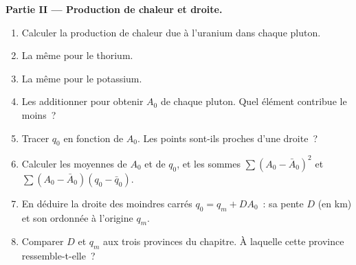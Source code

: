 \begin{problem}
\noindent\textbf{Partie II --- Production de chaleur et droite.}
\begin{enumerate}[resume]
  \item Calculer la production de chaleur due à l'uranium dans chaque pluton.
  \item La même pour le thorium.
  \item La même pour le potassium.
  \item Les additionner pour obtenir $A_0$ de chaque pluton. Quel élément contribue
        le moins~?
  \item Tracer $q_0$ en fonction de $A_0$. Les points sont-ils proches d'une droite~?
  \item Calculer les moyennes de $A_0$ et de $q_0$, et les sommes
        $\sum (A_0 - \bar A_0)^2$ et $\sum (A_0 - \bar A_0)(q_0 - \bar q_0)$.
  \item En déduire la droite des moindres carrés $q_0 = q_m + D A_0$~: sa pente $D$ (en
        \unit{km}) et son ordonnée à l'origine $q_m$.
  \item Comparer $D$ et $q_m$ aux trois provinces du chapitre. À laquelle cette
        province ressemble-t-elle~?
\end{enumerate}


\end{problem}
